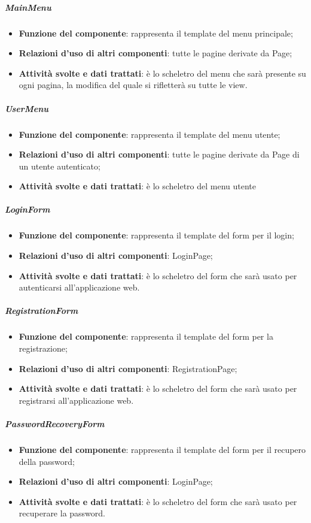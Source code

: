 \subparagraph{MainMenu}
\begin{itemize}
	\item \textbf{Funzione del componente}: rappresenta il template del menu principale;
	\item \textbf{Relazioni d’uso di altri componenti}: tutte le pagine derivate da Page;
	\item \textbf{Attività svolte e dati trattati}: \`{e} lo scheletro del menu che sar\`{a} presente su ogni pagina, la modifica del quale si rifletter\`{a} su tutte le view.
\end{itemize}

\subparagraph{UserMenu}
\begin{itemize}
	\item \textbf{Funzione del componente}: rappresenta il template del menu utente;
	\item \textbf{Relazioni d’uso di altri componenti}: tutte le pagine derivate da Page di un utente autenticato;
	\item \textbf{Attività svolte e dati trattati}: \`{e} lo scheletro del menu utente
\end{itemize}

\subparagraph{LoginForm}
\begin{itemize}
	\item \textbf{Funzione del componente}: rappresenta il template del form per il login;
	\item \textbf{Relazioni d’uso di altri componenti}: LoginPage;
	\item \textbf{Attività svolte e dati trattati}: \`{e} lo scheletro del form che sar\`{a} usato per autenticarsi all'applicazione web.
\end{itemize}

\subparagraph{RegistrationForm}
\begin{itemize}
	\item \textbf{Funzione del componente}: rappresenta il template del form per la registrazione;
	\item \textbf{Relazioni d’uso di altri componenti}: RegistrationPage;
	\item \textbf{Attività svolte e dati trattati}: \`{e} lo scheletro del form che sar\`{a} usato per registrarsi all'applicazione web.
\end{itemize}

\subparagraph{PasswordRecoveryForm}
\begin{itemize}
	\item \textbf{Funzione del componente}: rappresenta il template del form per il recupero della password;
	\item \textbf{Relazioni d’uso di altri componenti}: LoginPage;
	\item \textbf{Attività svolte e dati trattati}: \`{e} lo scheletro del form che sar\`{a} usato per recuperare la password.
\end{itemize}

